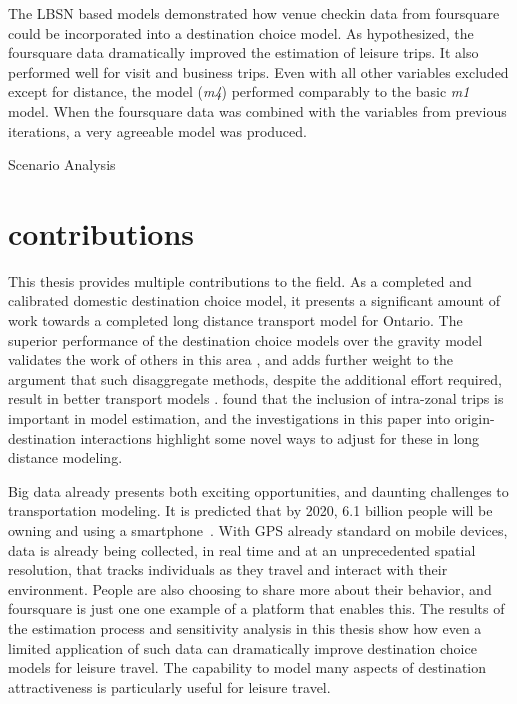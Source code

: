 The LBSN based models demonstrated how venue checkin data from foursquare could be incorporated into a destination choice model. As hypothesized, the foursquare data dramatically improved the estimation of leisure trips. It also performed well for visit and business trips. Even with all other variables excluded except for distance, the model (\textit{m4}) performed comparably to the basic \textit{m1} model. When the foursquare data was combined with the variables from previous iterations, a very agreeable model was produced. 

Scenario Analysis


\section{contributions}
This thesis provides multiple contributions to the field. As a completed and calibrated domestic destination choice model, it presents a significant amount of work towards a completed long distance transport model for Ontario. The superior performance of the destination choice models over the gravity model validates the work of others in this area \parencite{Mishra13}, 
and adds further weight to the argument that such disaggregate methods, despite the additional effort required, result in better transport models \parencite{sbayti2010best, lemp2007aggregate}. \textcite{bhatta2011intrazonal} found that the inclusion of intra-zonal trips is important in model estimation, and the investigations in this paper into origin-destination interactions highlight some novel ways to adjust for these in long distance modeling.

Big data already presents both exciting opportunities, and daunting challenges to transportation modeling. It is predicted that by 2020, 6.1 billion people will be owning and using a smartphone~\parencite{ericsson16}. With GPS already standard on mobile devices, data is already being collected, in real time and at an unprecedented spatial resolution, that tracks individuals as they travel and interact with their environment. People are also choosing to share more about their behavior, and foursquare is just one one example of a platform that enables this. The results of the estimation process and sensitivity analysis in this thesis show how even a limited application of such data can dramatically improve destination choice models for leisure travel. The capability to model many aspects of destination attractiveness is particularly useful for leisure travel.

